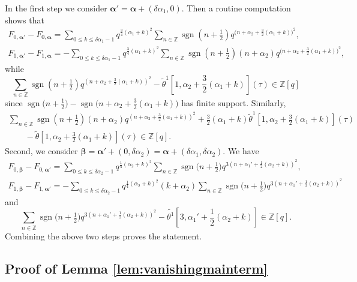 \documentclass[10pt,a4paper]{amsart}
\newcommand{\ZZ}{\mathbb{Z}}
\def\bal{\boldsymbol{\alpha}}
\def\bb{\boldsymbol{\beta}}
\def\t{\tau}
\theoremstyle{definition}
\numberwithin{equation}{section}
\begin{document}
In the first step we consider ${\bal '}=\bal + (\delta \alpha_1,0)$. Then a routine computation shows that
\begin{gather*}
F_{0,\bal' }- F_{0,\bal}= \sum_{0\leq k\leq \delta \alpha_1 -1} q^{\frac{3}{4}(\alpha_1 +k)^2} \sum_{n\in \ZZ} \operatorname{sgn}(n+\tfrac{1}{2}) q^{\bigl(n+\alpha_2+\frac{3}{2}(\alpha_1 +k)\bigr)^2},\\
F_{1,\bal' }- F_{1,\bal}= -\sum_{0\leq k\leq \delta \alpha_1 -1} q^{\frac{3}{4}(\alpha_1 +k)^2} \sum_{n\in \ZZ} \operatorname{sgn}(n+\tfrac{1}{2}) (n+\alpha_2)q^{\bigl(n+\alpha_2+\frac{3}{2}(\alpha_1 +k)\bigr)^2},
\end{gather*}
while
\[
\sum_{n\in \ZZ} \operatorname{sgn}(n+\tfrac{1}{2}) q^{(n+\alpha_2+\tfrac{3}{2}(\alpha_1 +k))^2} - {\tilde\theta}^1\left[1,\alpha_2+\frac{3}{2}(\alpha_1 +k)\right](\t) \in \ZZ[q]
\]
since $ \operatorname{sgn}\bigl(n+\tfrac{1}{2}\bigr)- \operatorname{sgn}\bigl(n+\alpha_2+\tfrac{3}{2}(\alpha_1 +k)\bigr)$ has finite support. Similarly,
\begin{gather*}
\sum_{n\in \ZZ} \operatorname{sgn}\left(n+\tfrac{1}{2}\right) (n+\alpha_2)q^{(n+\alpha_2+\tfrac{3}{2}(\alpha_1 +k))^2} + \frac{3}{2}(\alpha_1 +k){\tilde\theta}^1\left[1,\alpha_2+\frac{3}{2}(\alpha_1 +k)\right](\t)\\
\qquad {}- {\tilde\theta}\left[1,\alpha_2+\frac{3}{2}(\alpha_1 +k)\right](\t) \in \ZZ[q] .
\end{gather*}
Second, we consider $\bb= {\bal '}+ (0,\delta \alpha_2) =\bal + (\delta \alpha_1,\delta \alpha_2)$. We have
\begin{gather*}
F_{0,\bb}- F_{0,\bal'}= \sum_{0\leq k\leq \delta \alpha_2 -1} q^{\frac{1}{4}(\alpha_2 +k)^2} \sum_{n\in \ZZ} \operatorname{sgn}\bigl(n+\tfrac{1}{2}\bigr) q^{3(n+\alpha_1'+\frac{1}{2}(\alpha_2 +k))^2},\\
F_{1,\bb}- F_{1,\bal'}= -\sum_{0\leq k\leq \delta \alpha_2 -1} q^{\frac{1}{4}(\alpha_2 +k)^2} (k+\alpha_2) \sum_{n\in \ZZ} \operatorname{sgn}\bigl(n+\tfrac{1}{2}\bigr) q^{3(n+\alpha_1'+\frac{1}{2}(\alpha_2 +k))^2}
\end{gather*}
and
\[
\sum_{n\in \ZZ} \operatorname{sgn}\bigl(n+\tfrac{1}{2}\bigr) q^{3(n+\alpha_1'+\frac{1}{2}(\alpha_2 +k))^2} - \tilde{\theta^1}\left[3,\alpha_1'+\frac{1}{2}(\alpha_2 +k)\right] \in \ZZ[q].
\]
Combining the above two steps proves the statement.

\subsection{Proof of Lemma \ref{lem:vanishingmainterm}}
\label{pf_lem:vanishingmainterm}
\end{document}
